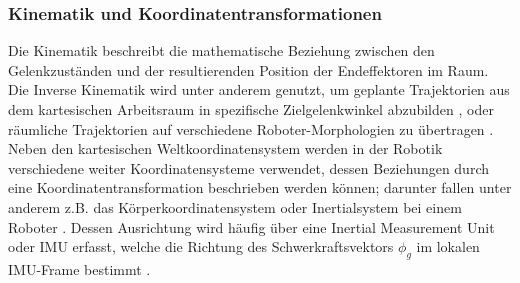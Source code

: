 \subsubsection{Kinematik und Koordinatentransformationen}
Die Kinematik beschreibt die mathematische Beziehung zwischen den Gelenkzuständen und der resultierenden Position der Endeffektoren im Raum. Die Inverse Kinematik wird unter anderem genutzt, um geplante Trajektorien aus dem kartesischen Arbeitsraum in spezifische Zielgelenkwinkel abzubilden \cite{bussolaGuidedReinforcementLearning2025, yinRunDogLearning2021}, oder räumliche Trajektorien auf verschiedene Roboter-Morphologien zu übertragen \cite{bussolaGuidedReinforcementLearning2025}. \newline
Neben den kartesischen Weltkoordinatensystem werden in der Robotik verschiedene weiter Koordinatensysteme verwendet, dessen Beziehungen durch eine Koordinatentransformation beschrieben werden können; darunter fallen unter anderem z.B. das Körperkoordinatensystem oder Inertialsystem bei einem Roboter \cite{hwangboLearningAgileDynamic2019, yinRunDogLearning2021}. Dessen Ausrichtung wird häufig über eine Inertial Measurement Unit oder IMU erfasst, welche die Richtung des Schwerkraftsvektors $\phi_g$ im lokalen IMU-Frame bestimmt \cite{hwangboLearningAgileDynamic2019}. 

